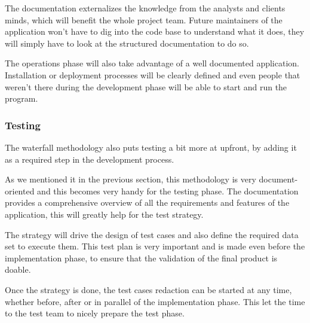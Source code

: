 The documentation externalizes the knowledge from the analysts and clients
minds, which will benefit the whole project team.
Future maintainers of the application won't have to dig into the code base to
understand what it does, they will simply have to look at the structured
documentation to do so.

The operations phase will also take advantage of a well documented
application.
Installation or deployment processes will be clearly defined and even people
that  weren't there during the development phase will be able to start and
run the program.

\subsubsection{Testing}

The waterfall methodology also puts testing a bit more at upfront, by adding
it as a required step in the development process.

As we mentioned it in the previous section, this methodology is very
document-oriented and this becomes very handy for the testing phase.
The documentation provides a comprehensive overview of all the requirements
and features of the application, this will greatly help for the test
strategy.

The strategy will drive the design of test cases and also define the
required data set to execute them.
This test plan is very important and is made even before the implementation
phase, to ensure that the validation of the final product is doable.

Once the strategy is done, the test cases redaction can be started at any
time, whether before, after or in parallel of the implementation phase.
This let the time to the test team to nicely prepare the test phase.


